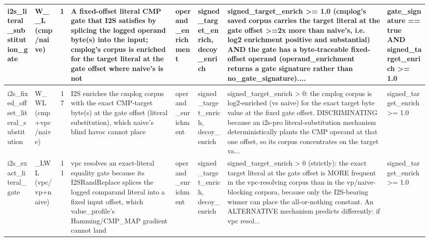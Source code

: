 \documentclass[7pt]{extarticle}
\begin{document}
{\begin{longtable}{@{}p{2.4cm}p{1.9cm}rp{4.3cm}p{1.5cm}p{1.7cm}p{4.6cm}p{3.0cm}@{}}
i2s\_\allowbreak literal\_\allowbreak substitution\_\allowbreak gate & W\_\allowbreak \_\allowbreak L (cmp/naive) & 1 & A fixed-offset literal CMP gate that I2S satisfies by splicing the logged operand byte(s) into the input; cmplog's corpus is enriched for the target literal at the gate offset where naive's is not & operand\_\allowbreak enrichment & signed\_\allowbreak target\_\allowbreak enrich, decoy\_\allowbreak enrich & signed\_\allowbreak target\_\allowbreak enrich \textgreater{}= 1.0 (cmplog's saved corpus carries the target literal at the gate offset \textgreater{}=2x more than naive's, i.e. log2 enrichment positive and substantial) AND the gate has a byte-traceable fixed-offset operand (operand\_\allowbreak enrichment returns a gate signature rather than no\_\allowbreak gate\_\allowbreak signature).... & gate\_\allowbreak signature == true AND signed\_\allowbreak target\_\allowbreak enrich \textgreater{}= 1.0\\
\midrule
\rowcolor{black!10}\multicolumn{8}{@{}l}{\textbf{[I2S-pro]\ \ i2s\_\allowbreak numeric\_\allowbreak tag\_\allowbreak substitution}\quad(final feature, n=39)}\\
i2s\_\allowbreak fixed\_\allowbreak offset\_\allowbreak literal\_\allowbreak substitution & W\_\allowbreak WL (cmp+vpc/naive) & 17 & I2S enriches the cmplog corpus with the exact CMP-target byte(s) at the gate offset (literal substitution), which naive's blind havoc cannot place & operand\_\allowbreak enrichment & signed\_\allowbreak target\_\allowbreak enrich, decoy\_\allowbreak enrich & signed\_\allowbreak target\_\allowbreak enrich \textgreater{} 0: the cmplog corpus is log2-enriched (vs naive) for the exact target byte value at the fixed gate offset. DISCRIMINATING because an i2s-pro literal-substitution mechanism deterministically plants the CMP operand at that one offset, so its corpus concentrates on the target va... & signed\_\allowbreak target\_\allowbreak enrich \textgreater{}= 1.0\\
i2s\_\allowbreak exact\_\allowbreak literal\_\allowbreak gate & \_\allowbreak LWL (vpc/vp+naive) & 11 & vpc resolves an exact-literal equality gate because its I2SRandReplace splices the logged comparand literal into a fixed input offset, which value\_\allowbreak profile's Hamming/CMP\_\allowbreak MAP gradient cannot land & operand\_\allowbreak enrichment & signed\_\allowbreak target\_\allowbreak enrich, decoy\_\allowbreak enrich & signed\_\allowbreak target\_\allowbreak enrich \textgreater{} 0 (strictly): the exact target literal at the gate offset is MORE frequent in the vpc-resolving corpus than in the vp/naive-blocking corpora, because only the I2S-bearing winner can place the all-or-nothing constant. An ALTERNATIVE mechanism predicts differently: if vpc resol... & signed\_\allowbreak target\_\allowbreak enrich \textgreater{}= 1.0\\

\end{longtable}}
\end{document}
